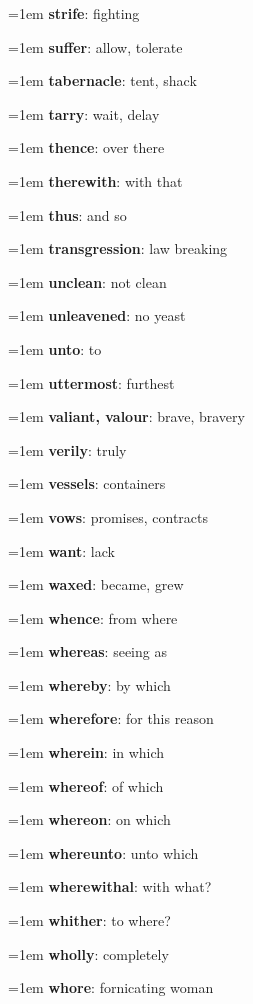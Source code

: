 {\begin{multicols}{3}
{\hangindent=1em \textbf{strife}: fighting\par
\hangindent=1em \textbf{suffer}: allow, tolerate\par
\hangindent=1em \textbf{tabernacle}: tent, shack\par
\hangindent=1em \textbf{tarry}: wait, delay\par
\hangindent=1em \textbf{thence}: over there\par
\hangindent=1em \textbf{therewith}: with that\par
\hangindent=1em \textbf{thus}: and so\par
\hangindent=1em \textbf{transgression}: law breaking\par
\hangindent=1em \textbf{unclean}: not clean\par
\hangindent=1em \textbf{unleavened}: no yeast\par
\hangindent=1em \textbf{unto}: to\par
\hangindent=1em \textbf{uttermost}: furthest\par
\hangindent=1em \textbf{valiant, valour}: brave, bravery\par
\hangindent=1em \textbf{verily}: truly\par
\hangindent=1em \textbf{vessels}: containers\par
\hangindent=1em \textbf{vows}: promises, contracts\par
\hangindent=1em \textbf{want}: lack\par
\hangindent=1em \textbf{waxed}: became, grew\par
\hangindent=1em \textbf{whence}: from where\par
\hangindent=1em \textbf{whereas}: seeing as\par
\hangindent=1em \textbf{whereby}: by which\par
\hangindent=1em \textbf{wherefore}: for this reason\par
\hangindent=1em \textbf{wherein}: in which\par
\hangindent=1em \textbf{whereof}: of which\par
\hangindent=1em \textbf{whereon}: on which\par
\hangindent=1em \textbf{whereunto}: unto which\par
\hangindent=1em \textbf{wherewithal}: with what?\par
\hangindent=1em \textbf{whither}: to where?\par
\hangindent=1em \textbf{wholly}: completely\par
\hangindent=1em \textbf{whore}: fornicating woman\par
}
\end{multicols}}

